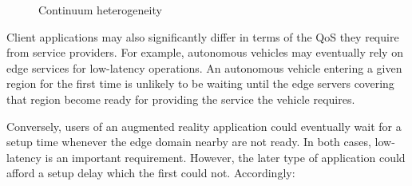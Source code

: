 \begin{figure}[tbp]
	\centering
	\captionsetup[subfigure]{width=0.53\textwidth}	
	\null\hfill
	\captionsetup[subfigure]{width=0.45\textwidth}	
	\hfill
	\hfill\null
	\caption{Continuum heterogeneity}\label{fig:1}
\end{figure}


Client applications may also significantly differ in terms of the QoS they require from service providers. For example, autonomous vehicles may eventually rely on edge services for low-latency operations. An autonomous vehicle entering a given region for the first time is unlikely to be waiting until the edge servers covering that region become ready for providing the service the vehicle requires. 

Conversely, users of an augmented reality application could eventually wait for a setup time whenever the edge domain nearby are not ready. In both cases, low-latency is an important requirement. However, the later type of application could afford a setup delay which the first could not. Accordingly:

